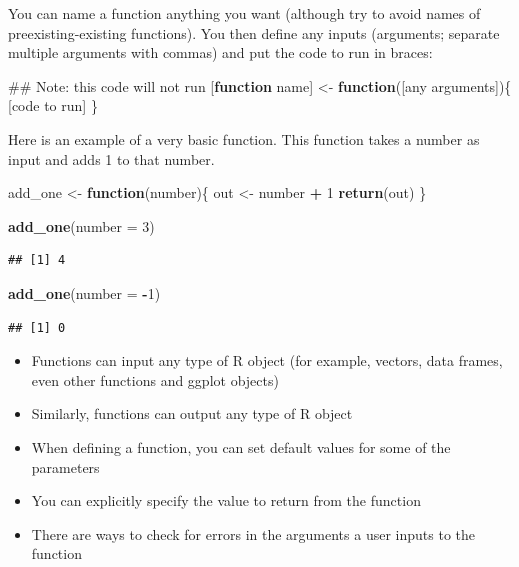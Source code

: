 \documentclass[]{book}
\makeatletter
\newenvironment{Shaded}{\begin{snugshade}}{\end{snugshade}}
\newcommand{\KeywordTok}[1]{\textcolor[rgb]{0.13,0.29,0.53}{\textbf{#1}}}
\newcommand{\DataTypeTok}[1]{\textcolor[rgb]{0.13,0.29,0.53}{#1}}
\newcommand{\DecValTok}[1]{\textcolor[rgb]{0.00,0.00,0.81}{#1}}
\newcommand{\StringTok}[1]{\textcolor[rgb]{0.31,0.60,0.02}{#1}}
\newcommand{\ControlFlowTok}[1]{\textcolor[rgb]{0.13,0.29,0.53}{\textbf{#1}}}
\newcommand{\OperatorTok}[1]{\textcolor[rgb]{0.81,0.36,0.00}{\textbf{#1}}}
\newcommand{\NormalTok}[1]{#1}
\providecommand{\tightlist}{%
  \setlength{\itemsep}{0pt}\setlength{\parskip}{0pt}}
\newenvironment{kframe}{%
\medskip{}
\setlength{\fboxsep}{.8em}
 \def\at@end@of@kframe{}%
 \ifinner\ifhmode%
  \def\at@end@of@kframe{\end{minipage}}%
  \begin{minipage}{\columnwidth}%
 \fi\fi%
 \def\FrameCommand##1{\hskip\@totalleftmargin \hskip-\fboxsep
 \colorbox{shadecolor}{##1}\hskip-\fboxsep
     \hskip-\linewidth \hskip-\@totalleftmargin \hskip\columnwidth}%
 \MakeFramed {\advance\hsize-\width
   \@totalleftmargin\z@ \linewidth\hsize
   \@setminipage}}%
 {\par\unskip\endMakeFramed%
 \at@end@of@kframe}
\renewenvironment{Shaded}{\begin{kframe}}{\end{kframe}}
\theoremstyle{definition}
\theoremstyle{definition}
\theoremstyle{definition}
\theoremstyle{remark}
\makeatother
\begin{document}
You can name a function anything you want (although try to avoid names
of preexisting-existing functions). You then define any inputs
(arguments; separate multiple arguments with commas) and put the code to
run in braces:

\begin{Shaded}
\begin{Highlighting}[]
\NormalTok{## Note: this code will not run}
\NormalTok{[}\ControlFlowTok{function}\NormalTok{ name] <-}\StringTok{ }\ControlFlowTok{function}\NormalTok{([any arguments])\{}
\NormalTok{        [code to run]}
\NormalTok{\}}
\end{Highlighting}
\end{Shaded}

Here is an example of a very basic function. This function takes a
number as input and adds 1 to that number.

\begin{Shaded}
\begin{Highlighting}[]
\NormalTok{add_one <-}\StringTok{ }\ControlFlowTok{function}\NormalTok{(number)\{}
\NormalTok{        out <-}\StringTok{ }\NormalTok{number }\OperatorTok{+}\StringTok{ }\DecValTok{1}
        \KeywordTok{return}\NormalTok{(out)}
\NormalTok{\}}

\KeywordTok{add_one}\NormalTok{(}\DataTypeTok{number =} \DecValTok{3}\NormalTok{)}
\end{Highlighting}
\end{Shaded}

\begin{verbatim}
## [1] 4
\end{verbatim}

\begin{Shaded}
\begin{Highlighting}[]
\KeywordTok{add_one}\NormalTok{(}\DataTypeTok{number =} \OperatorTok{-}\DecValTok{1}\NormalTok{)}
\end{Highlighting}
\end{Shaded}

\begin{verbatim}
## [1] 0
\end{verbatim}

\begin{itemize}
\tightlist
\item
  Functions can input any type of R object (for example, vectors, data
  frames, even other functions and ggplot objects)
\item
  Similarly, functions can output any type of R object
\item
  When defining a function, you can set default values for some of the
  parameters
\item
  You can explicitly specify the value to return from the function
\item
  There are ways to check for errors in the arguments a user inputs to
  the function
\end{itemize}
\end{document}
